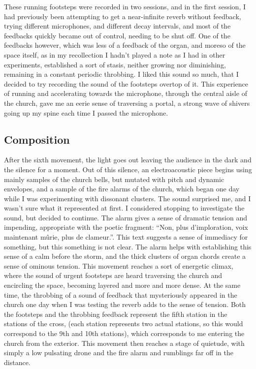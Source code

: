 \documentclass[12pt,twoside,maitrise]{dms_ks}
\theoremstyle{definition}
\begin{document}
These running footsteps were recorded in two sessions, and in the first session, I had previously been attempting to get a near-infinite reverb without feedback, trying different microphones, and different decay intervals, and most of the feedbacks quickly became out of control, needing to be shut off.
One of the feedbacks however, which was less of a feedback of the organ, and moreso of the space itself, as in my recollection I hadn't played a note as I had in other experiments, established a sort of stasis, neither growing nor diminishing, remaining in a constant periodic throbbing.
I liked this sound so much, that I decided to try recording the sound of the footsteps overtop of it.
This experience of running and accelerating towards the microphone, through the central aisle of the church, gave me an eerie sense of traversing a portal, a strong wave of shivers going up my spine each time I passed the microphone.

\subsection{Composition}

After the sixth movement, the light goes out leaving the audience in the dark and the silence for a moment.
Out of this silence, an electroacoustic piece begins using mainly samples of the church bells, but mutated with pitch and dynamic envelopes, and a sample of the fire alarms of the church, which began one day while I was experimenting with dissonant clusters.
The sound surprised me, and I wasn’t sure what it represented at first.
I considered stopping to investigate the sound, but decided to continue.
The alarm gives a sense of dramatic tension and impending, appropriate with the poetic fragment: “Non, plus d’imploration, voix maintenant mûrie, plus de clameur.”.
This text suggests a sense of immediacy for something, but this something is not clear.
The alarm helps with establishing this sense of a calm before the storm, and the thick clusters of organ chords create a sense of ominous tension.
This movement reaches a sort of energetic climax, where the sound of urgent footsteps are heard traversing the church and encircling the space, becoming layered and more and more dense.
At the same time, the throbbing of a sound of feedback that mysteriously appeared in the church one day when I was testing the reverb adds to the sense of tension.
Both the footsteps and the throbbing feedback represent the fifth station in the stations of the cross, (each station represents two actual stations, so this would correspond to the 9th and 10th stations), which corresponds to me entering the church from the exterior.
This movement then reaches a stage of quietude, with simply a low pulsating drone and the fire alarm and rumblings far off in the distance.
\end{document}
